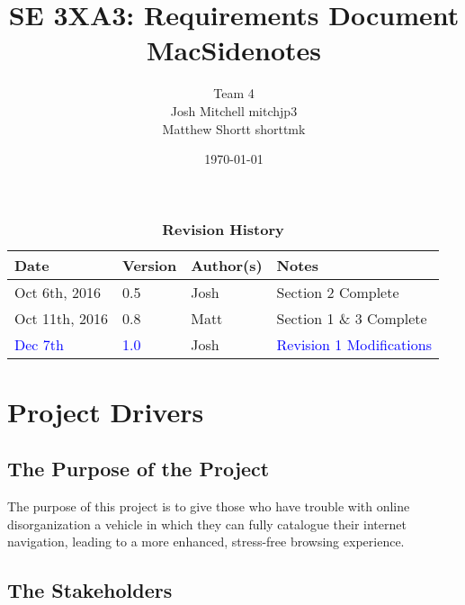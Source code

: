 \documentclass[12pt, titlepage]{article}
\title{SE 3XA3: Requirements Document\\MacSidenotes}
\author{Team 4
		\\ Josh Mitchell mitchjp3
		\\ Matthew Shortt shorttmk
}
\date{\today}
\begin{document}
\maketitle

\tableofcontents
\listoftables
\listoffigures



\begin{table}[H]
\caption{\bf Revision History}
\begin{tabularx}{\textwidth}{p{3cm}p{2cm}p{2cm}X}
\toprule {\bf Date} & {\bf Version} & {\bf Author(s)} & {\bf Notes}\\
\midrule
Oct 6th, 2016 & 0.5 & Josh & Section 2 Complete\\
Oct 11th, 2016 & 0.8 & Matt & Section 1 \& 3 Complete\\
\textcolor{blue}{Dec 7th} & \textcolor{blue}{1.0} & Josh 
&\textcolor{blue}{Revision 1 Modifications}\\
\bottomrule
\end{tabularx}
\end{table}

\newpage




\section{Project Drivers}

\subsection{The Purpose of the Project}

The purpose of this project is to give those who have trouble with online disorganization 
a vehicle in which they can fully catalogue their internet navigation, leading to a more 
enhanced, stress-free browsing experience. 

\subsection{The Stakeholders}
\end{document}
